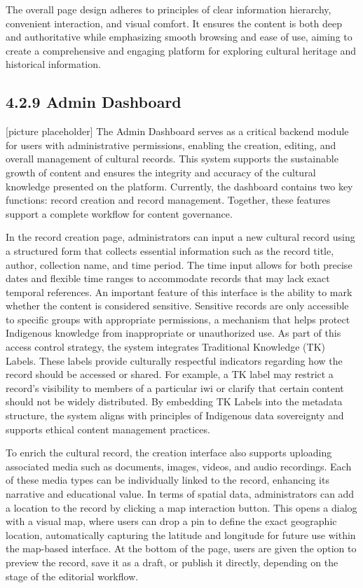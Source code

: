 The overall page design adheres to principles of clear information hierarchy, convenient interaction, and visual comfort. It ensures the content is both deep and authoritative while emphasizing smooth browsing and ease of use, aiming to create a comprehensive and engaging platform for exploring cultural heritage and historical information.

\subsection*{4.2.9 Admin Dashboard}
[picture placeholder]
The Admin Dashboard serves as a critical backend module for users with administrative permissions, enabling the creation, editing, and overall management of cultural records. This system supports the sustainable growth of content and ensures the integrity and accuracy of the cultural knowledge presented on the platform. Currently, the dashboard contains two key functions: record creation and record management. Together, these features support a complete workflow for content governance.

In the record creation page, administrators can input a new cultural record using a structured form that collects essential information such as the record title, author, collection name, and time period. The time input allows for both precise dates and flexible time ranges to accommodate records that may lack exact temporal references. An important feature of this interface is the ability to mark whether the content is considered sensitive. Sensitive records are only accessible to specific groups with appropriate permissions, a mechanism that helps protect Indigenous knowledge from inappropriate or unauthorized use. As part of this access control strategy, the system integrates Traditional Knowledge (TK) Labels. These labels provide culturally respectful indicators regarding how the record should be accessed or shared. For example, a TK label may restrict a record's visibility to members of a particular iwi or clarify that certain content should not be widely distributed. By embedding TK Labels into the metadata structure, the system aligns with principles of Indigenous data sovereignty and supports ethical content management practices.

To enrich the cultural record, the creation interface also supports uploading associated media such as documents, images, videos, and audio recordings. Each of these media types can be individually linked to the record, enhancing its narrative and educational value. In terms of spatial data, administrators can add a location to the record by clicking a map interaction button. This opens a dialog with a visual map, where users can drop a pin to define the exact geographic location, automatically capturing the latitude and longitude for future use within the map-based interface. At the bottom of the page, users are given the option to preview the record, save it as a draft, or publish it directly, depending on the stage of the editorial workflow.

